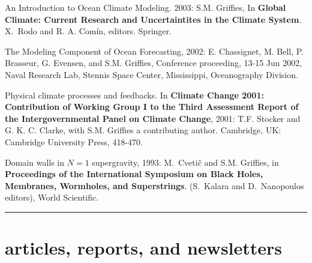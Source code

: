 \begin{etaremune}
\item An Introduction to Ocean Climate Modeling.  2003: S.M. Grif\/f\/ies, In {\bf Global Climate: Current Research and Uncertaintites in the Climate System}. X.\ Rodo and R. A. Com\'in, editors.  Springer.

\item The Modeling Component of Ocean Forecasting, 2002:
E. Chassignet, M. Bell, P. Brasseur, G. Evensen, and S.M. Grif\/f\/ies, Conference proceeding, 13-15 Jun 2002, Naval
Research Lab, Stennis Space Center, Mississippi, Oceanography Division.

\item Physical climate processes and feedbacks. In {\bf Climate Change 2001: Contribution of Working Group I to the Third Assessment Report of the Intergovernmental Panel on Climate Change}, 2001: T.F. Stocker and G. K. C. Clarke, with S.M. Grif\/f\/ies a contributing author.  Cambridge, UK: Cambridge University Press, 418-470.

\item Domain walls in $N=1$ supergravity, 1993: M.\ Cveti\v c and S.M. Grif\/f\/ies, in {\bf Proceedings of the International Symposium on Black Holes, Membranes, Wormholes, and Superstrings}. (S.\ Kalara and D.\ Nanopoulos editors), World Scientific.

\end{etaremune}

\noindent\rule{\textwidth}{1pt}
\vspace{-1cm}
\section*{\sc \color{Maroon} articles, reports, and newsletters}

